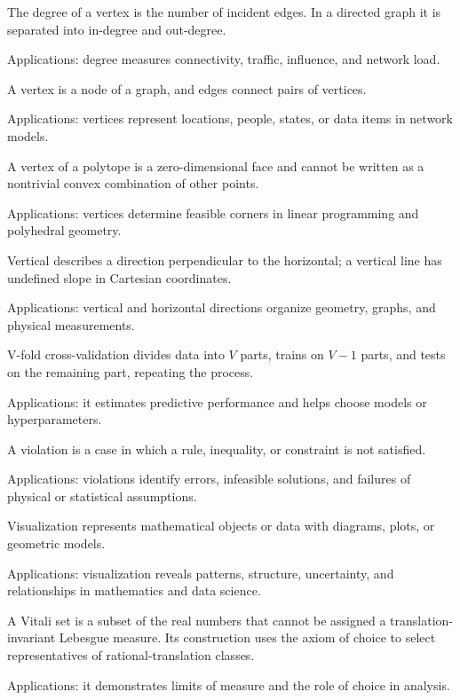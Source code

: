 The degree of a vertex is the number of incident edges. In a directed graph it is separated into in-degree and out-degree. \par\noindent Applications: degree measures connectivity, traffic, influence, and network load.

A vertex is a node of a graph, and edges connect pairs of vertices. \par\noindent Applications: vertices represent locations, people, states, or data items in network models.

A vertex of a polytope is a zero-dimensional face and cannot be written as a nontrivial convex combination of other points. \par\noindent Applications: vertices determine feasible corners in linear programming and polyhedral geometry.

Vertical describes a direction perpendicular to the horizontal; a vertical line has undefined slope in Cartesian coordinates. \par\noindent Applications: vertical and horizontal directions organize geometry, graphs, and physical measurements.

V-fold cross-validation divides data into $V$ parts, trains on $V-1$ parts, and tests on the remaining part, repeating the process. \par\noindent Applications: it estimates predictive performance and helps choose models or hyperparameters.

A violation is a case in which a rule, inequality, or constraint is not satisfied. \par\noindent Applications: violations identify errors, infeasible solutions, and failures of physical or statistical assumptions.

Visualization represents mathematical objects or data with diagrams, plots, or geometric models. \par\noindent Applications: visualization reveals patterns, structure, uncertainty, and relationships in mathematics and data science.

A Vitali set is a subset of the real numbers that cannot be assigned a translation-invariant Lebesgue measure. Its construction uses the axiom of choice to select representatives of rational-translation classes. \par\noindent Applications: it demonstrates limits of measure and the role of choice in analysis.

